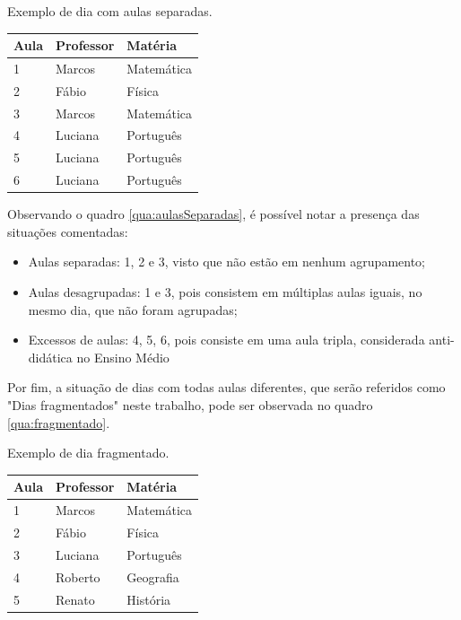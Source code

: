 \begin{quadro}[!htb]
	\centering
	\caption{Exemplo de dia com aulas separadas.\label{qua:aulasSeparadas}}
	\begin{tabular}{|p{3cm}|p{3cm}|p{3cm}|}
		\hline
		\textbf{Aula} & \textbf{Professor} & \textbf{Matéria} \\
		\hline
		1 & Marcos & Matemática \\
		\hline
		2 & Fábio & Física \\
		\hline
		3 & Marcos & Matemática \\
		\hline
		4 & Luciana & Português \\
		\hline
		5 & Luciana & Português \\
		\hline
		6 & Luciana & Português \\
		\hline
	\end{tabular}
\end{quadro}

Observando o quadro \ref{qua:aulasSeparadas}, é possível notar a presença das situações comentadas:

\begin{itemize}
	\item Aulas separadas: 1, 2 e 3, visto que não estão em nenhum agrupamento;
	\item Aulas desagrupadas: 1 e 3, pois consistem em múltiplas aulas iguais, no mesmo dia, que não foram agrupadas;
	\item Excessos de aulas: 4, 5, 6, pois consiste em uma aula tripla, considerada anti-didática no Ensino Médio
\end{itemize}

Por fim, a situação de dias com todas aulas diferentes, que serão referidos como "Dias fragmentados" neste trabalho, pode ser observada no quadro \ref{qua:fragmentado}.

\begin{quadro}[!htb]
	\centering
	\caption{Exemplo de dia fragmentado.\label{qua:fragmentado}}
	\begin{tabular}{|p{3cm}|p{3cm}|p{3cm}|}
		\hline
		\textbf{Aula} & \textbf{Professor} & \textbf{Matéria} \\
		\hline
		1 & Marcos & Matemática \\
		\hline
		2 & Fábio & Física \\
		\hline
		3 & Luciana & Português \\
		\hline
		4 & Roberto & Geografia \\
		\hline
		5 & Renato & História \\
		\hline
	\end{tabular}
\end{quadro}

